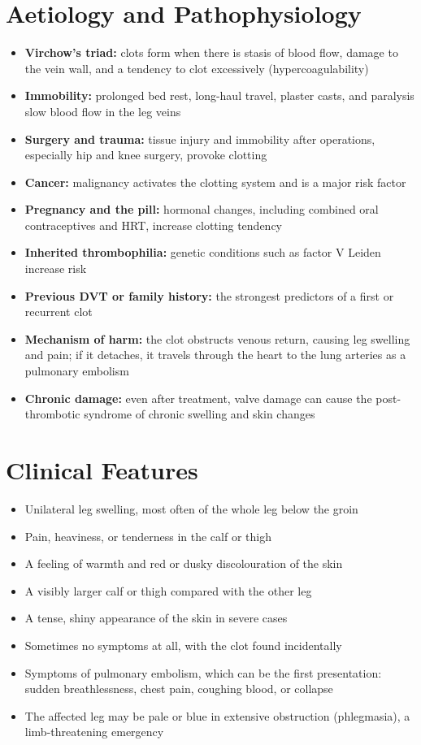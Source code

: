 \section*{Aetiology and Pathophysiology}
\begin{itemize}
    \item \textbf{Virchow's triad:} clots form when there is stasis of blood flow, damage to the vein wall, and a tendency to clot excessively (hypercoagulability)
    \item \textbf{Immobility:} prolonged bed rest, long-haul travel, plaster casts, and paralysis slow blood flow in the leg veins
    \item \textbf{Surgery and trauma:} tissue injury and immobility after operations, especially hip and knee surgery, provoke clotting
    \item \textbf{Cancer:} malignancy activates the clotting system and is a major risk factor
    \item \textbf{Pregnancy and the pill:} hormonal changes, including combined oral contraceptives and HRT, increase clotting tendency
    \item \textbf{Inherited thrombophilia:} genetic conditions such as factor V Leiden increase risk
    \item \textbf{Previous DVT or family history:} the strongest predictors of a first or recurrent clot
    \item \textbf{Mechanism of harm:} the clot obstructs venous return, causing leg swelling and pain; if it detaches, it travels through the heart to the lung arteries as a pulmonary embolism
    \item \textbf{Chronic damage:} even after treatment, valve damage can cause the post-thrombotic syndrome of chronic swelling and skin changes
\end{itemize}

\section*{Clinical Features}
\begin{itemize}
    \item Unilateral leg swelling, most often of the whole leg below the groin
    \item Pain, heaviness, or tenderness in the calf or thigh
    \item A feeling of warmth and red or dusky discolouration of the skin
    \item A visibly larger calf or thigh compared with the other leg
    \item A tense, shiny appearance of the skin in severe cases
    \item Sometimes no symptoms at all, with the clot found incidentally
    \item Symptoms of pulmonary embolism, which can be the first presentation: sudden breathlessness, chest pain, coughing blood, or collapse
    \item The affected leg may be pale or blue in extensive obstruction (phlegmasia), a limb-threatening emergency
\end{itemize}


